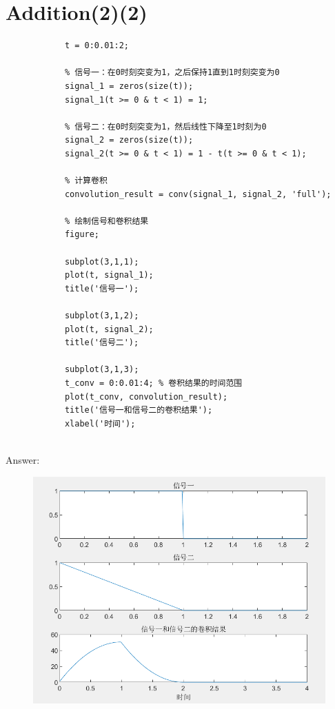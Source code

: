 \documentclass{article}
\begin{document}
    \section*{Addition(2)(2)}
        \begin{lstlisting}[caption={题Additional(2)(2)MATLAB代码}, label={lst:matlab}]
            % 定义时间向量
            t = 0:0.01:2;

            % 信号一：在0时刻突变为1，之后保持1直到1时刻突变为0
            signal_1 = zeros(size(t));
            signal_1(t >= 0 & t < 1) = 1;

            % 信号二：在0时刻突变为1，然后线性下降至1时刻为0
            signal_2 = zeros(size(t));
            signal_2(t >= 0 & t < 1) = 1 - t(t >= 0 & t < 1);

            % 计算卷积
            convolution_result = conv(signal_1, signal_2, 'full');

            % 绘制信号和卷积结果
            figure;

            subplot(3,1,1);
            plot(t, signal_1);
            title('信号一');

            subplot(3,1,2);
            plot(t, signal_2);
            title('信号二');

            subplot(3,1,3);
            t_conv = 0:0.01:4; % 卷积结果的时间范围
            plot(t_conv, convolution_result);
            title('信号一和信号二的卷积结果');
            xlabel('时间');


        \end{lstlisting}
        Answer: 
            \begin{figure}[h]
                \includegraphics{additional_2.png}
            \end{figure}
            \FloatBarrier
\end{document}
